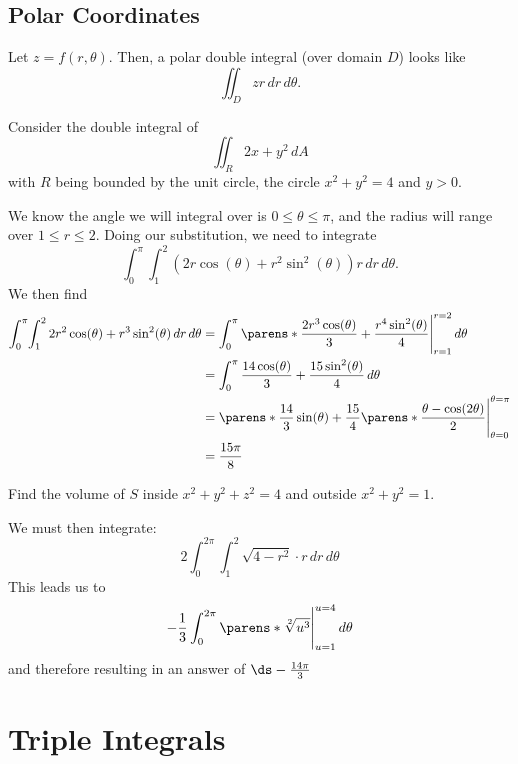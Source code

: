 \documentclass{article}
\begin{document}
\subsection{Polar Coordinates}

Let $z = f(r, \theta)$. Then, a polar double integral (over domain $D$) looks like
\[ \iint_{D} z r \, dr \, d\theta. \]

\begin{ex}
  Consider the double integral of
  \[ \iint_{R} 2x+y^{2}\, dA \]
  with $R$ being bounded by the unit circle, the circle $x^{2} + y^{2} = 4$ and $y > 0$.

  We know the angle we will integral over is $0 \le \theta \le \pi$, and the radius will
  range over $1 \le r \le 2$. Doing our substitution, we need to integrate
  \[ \int_{0}^{\pi}\int_{1}^{2} (2r \cos(\theta) + r^{2}\sin^{2}(\theta)) r \, dr\, d\theta. \]
  We then find
  \begin{equation}
    \begin{split}
      \int_{0}^{\pi} \negmedspace \int_{1}^{2} 2r^{2}\cos(\theta) + r^{3}\sin^{2}(\theta) \, dr \, d\theta
      &= \int_{0}^{\pi} \parens*{\frac{2r^{3}\cos(\theta)}{3} + \frac{r^{4}\sin^{2}(\theta)}{4}}\Bigg|_{r = 1}^{r = 2} \, d\theta\\
      &= \int_{0}^{\pi} \frac{14\cos(\theta)}{3} + \frac{15\sin^{2}(\theta)}{4} \, d\theta\\
      &= \parens*{\frac{14}{3}\sin(\theta) + \frac{15}{4}\parens*{\frac{\theta - \cos(2\theta)}{2}}}\Bigg|_{\theta = 0}^{\theta = \pi}\\
      &= \frac{15\pi}{8}
    \end{split}
  \end{equation}
\end{ex}

\begin{ex}
  Find the volume of $S$ inside $x^{2} + y^{2} + z^{2} = 4$ and outside $x^{2} + y^{2} = 1$.

  We must then integrate:
  \[ 2\int_{0}^{2\pi}\int_{1}^{2} \sqrt{4 - r^{2}} \cdot r \, dr \, d\theta \]
  This leads us to
  \[ -\frac{1}{3}\int_{0}^{2\pi} \parens*{\sqrt[2]{u^{3}}}\Bigg|_{u = 1}^{u = 4} \, d\theta \]
  and therefore resulting in an answer of $\ds-\frac{14\pi}{3}$
\end{ex}

\section{Triple Integrals}
\end{document}
